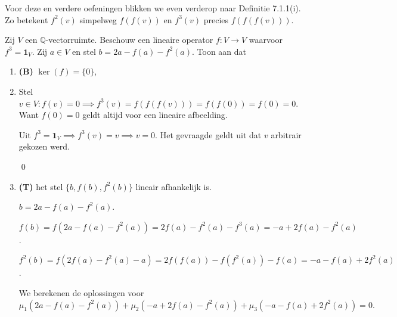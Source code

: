 \begin{oefening}[3.2.4]
    Voor deze en verdere oefeningen blikken we even verderop naar Definitie 7.1.1(i). Zo betekent $f^2(v)$ simpelweg $f(f(v))$ en $f^3(v)$ precies $f(f(f(v)))$.

    Zij $V$ een $\mathbb{Q}$-vectorruimte. Beschouw een lineaire operator $f \colon V \to V$ waarvoor $f^3 = \mathbf{1}_V$. Zij $a \in V$ en stel $b = 2a - f(a) - f^2(a)$. Toon aan dat
    \begin{enumerate}
        \item[(a)] \textbf{(B)} $\operatorname{ker}(f) = \{0\}$,
        \item[]
          Stel \(v \in V: f(v) = 0 \implies f^3(v) = f(f(f(v))) = f(f(0)) = f(0) = 0.\)
            Want \(f(0)= 0\) geldt altijd voor een lineaire afbeelding.

            Uit \(f^3 = \mathbf{1}_V \implies f^3(v) = v \implies v = 0.\) Het gevraagde geldt uit dat \(v\) arbitrair gekozen werd.

            \qed
        \item[(b)] \textbf{(T)} het stel $\{b, f(b), f^2(b)\}$ lineair afhankelijk is.

        \(b = 2a - f(a) - f^2(a) \).

        \(f(b) = f(2a - f(a) - f^2(a))
        = 2f(a) - f^2(a) - f^3(a)
        = -a + 2f(a) - f^2(a) \).

        \(f^2(b) = f(2f(a) - f^2(a) - a)
        = 2f(f(a)) - f(f^2(a)) - f(a)
        = -a-f(a)+2f^2(a)\).

        We berekenen de oplossingen voor \(\mu_1 (2a - f(a) - f^2(a)) + \mu_2 (-a + 2f(a) - f^2(a)) + \mu_3(-a-f(a)+2f^2(a)) = 0. \)


\end{enumerate}
\end{oefening}

